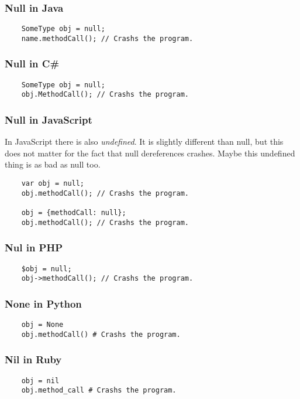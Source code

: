 \documentclass[a4paper,12pt]{report}
\begin{document}
\subsubsection{Null in Java}
\begin{verbatim}
    SomeType obj = null;
    name.methodCall(); // Crashs the program.
\end{verbatim}

\subsubsection{Null in C\#}
\begin{verbatim}
    SomeType obj = null;
    obj.MethodCall(); // Crashs the program.
\end{verbatim}

\subsubsection{Null in JavaScript}
In JavaScript there is also \textit{undefined}. It is slightly different than null, but this does not matter for the fact that null dereferences crashes. Maybe this undefined thing is as bad as null too.

\begin{verbatim}
    var obj = null;
    obj.methodCall(); // Crashs the program.

    obj = {methodCall: null};
    obj.methodCall(); // Crashs the program.
\end{verbatim}

\subsubsection{Nul in PHP}
\begin{verbatim}
    $obj = null;
    obj->methodCall(); // Crashs the program.    
\end{verbatim}

\subsubsection{None in Python}
\begin{verbatim}
    obj = None
    obj.methodCall() # Crashs the program.
\end{verbatim}

\subsubsection{Nil in Ruby}
\begin{verbatim}
    obj = nil
    obj.method_call # Crashs the program.
\end{verbatim}
\end{document}
